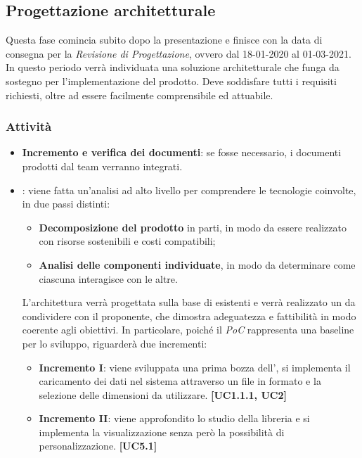 \subsection{Progettazione architetturale}
Questa fase comincia subito dopo la presentazione e finisce con la data di consegna per la \textit{Revisione di Progettazione}, ovvero dal 18-01-2020 al 01-03-2021.\\
In questo periodo verrà individuata una soluzione architetturale che funga da sostegno per l'implementazione del prodotto. Deve soddisfare tutti i requisiti richiesti, oltre ad essere facilmente comprensibile ed attuabile. 
\subsubsection{Attività}
\begin{itemize}
\item \textbf{Incremento e verifica dei documenti}: se fosse necessario, i documenti prodotti dal team verranno integrati.

 \item {}: viene fatta un'analisi ad alto livello per comprendere le tecnologie coinvolte, in due passi distinti:
\begin{itemize}
 \item \textbf{Decomposizione del prodotto} in parti, in modo da essere realizzato con risorse sostenibili e costi compatibili;
 \item \textbf{Analisi delle componenti individuate}, in modo da determinare come ciascuna interagisce con le altre.  
\end{itemize}
L'architettura verrà progettata sulla base di  esistenti e verrà realizzato un  da condividere con il proponente, che dimostra adeguatezza e fattibilità in modo coerente agli obiettivi. In particolare, poiché il \textit{PoC} rappresenta una baseline per lo sviluppo, riguarderà due incrementi:
\begin{itemize}
	\item \textbf{Incremento I}: viene sviluppata una prima bozza dell', si implementa il caricamento dei dati nel sistema attraverso un file in formato  e la selezione delle dimensioni da utilizzare. \textbf{[UC1.1.1, UC2]}
	\item \textbf{Incremento II}: viene approfondito lo studio della libreria  e si implementa la visualizzazione  senza però la possibilità di personalizzazione. \textbf{[UC5.1]}
\end{itemize} 

\end{itemize}

